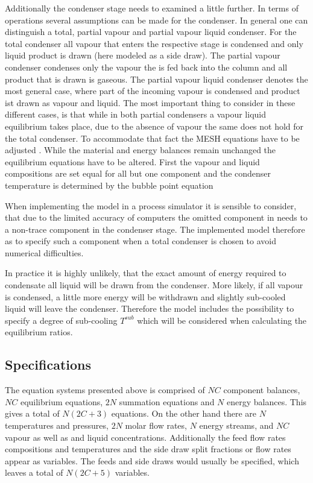         Additionally the condenser stage needs to examined a little further. In terms of operations
        several assumptions can be made for the condenser. In general one can distinguish a total,
        partial vapour and partial vapour liquid condenser. For the total condenser all vapour that
        enters the respective stage is condensed and only liquid product is drawn (here modeled as
        a side draw). The partial vapour condenser condenses only the vapour the is fed back into
        the column and all product that is drawn is gaseous. The partial vapour liquid condenser
        denotes the most general case, where part of the incoming vapour is condensed and product
        ist drawn as vapour and liquid. The most important thing to consider in these different cases,
        is that while in both partial condensers a vapour liquid equilibrium takes place, due to the
        absence of vapour the same does not hold for the total condenser. To accommodate that fact
        the MESH equations have to be adjusted \cite{Naphtali.1971}. While the material and energy
        balances remain unchanged the equilibrium equations have to be altered. First the vapour and
        liquid compositions are set equal for all but one component
        and the condenser temperature is determined by the bubble point equation

        When implementing the model in a process simulator it is sensible to consider, that due to
        the limited accuracy of computers the omitted component in  needs to
        a non-trace component in the condenser stage. The implemented model therefore as to specify
        such a component when a total condenser is chosen to avoid numerical difficulties.

        In practice it is highly unlikely, that the exact amount of energy required to condensate all
        liquid will be drawn from the condenser. More likely, if all vapour is condensed, a little more
        energy will be withdrawn and slightly sub-cooled liquid will leave the condenser. Therefore
        the model includes the possibility to specify a degree of sub-cooling $T^{sub}$ which will be
        considered when calculating the equilibrium ratios.

    \subsection{Specifications}
        The equation systems presented above is comprised of $NC$ component balances, $NC$ equilibrium
        equations, $2N$ summation equations and $N$ energy balances. This gives a total of $N (2C + 3)$
        equations. On the other hand there are $N$ temperatures and pressures, $2N$ molar flow rates,
        $N$ energy streams, and $NC$ vapour as well as and liquid concentrations. Additionally the feed flow rates
        compositions and temperatures and the side draw split fractions or flow rates appear as variables. The
        feeds and side draws would usually be specified, which leaves a total of $N (2C + 5)$ variables.

